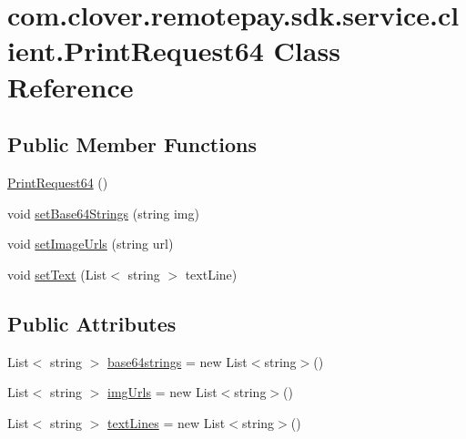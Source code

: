 \hypertarget{classcom_1_1clover_1_1remotepay_1_1sdk_1_1service_1_1client_1_1_print_request64}{}\section{com.\+clover.\+remotepay.\+sdk.\+service.\+client.\+Print\+Request64 Class Reference}
\label{classcom_1_1clover_1_1remotepay_1_1sdk_1_1service_1_1client_1_1_print_request64}
\subsection*{Public Member Functions}
\begin{DoxyCompactItemize}
\item 
\hyperlink{classcom_1_1clover_1_1remotepay_1_1sdk_1_1service_1_1client_1_1_print_request64_a1ee835745ac63886a435e6251f254d6b}{Print\+Request64} ()
\item 
void \hyperlink{classcom_1_1clover_1_1remotepay_1_1sdk_1_1service_1_1client_1_1_print_request64_ac56e340b57479f34256fe40683f8f828}{set\+Base64\+Strings} (string img)
\item 
void \hyperlink{classcom_1_1clover_1_1remotepay_1_1sdk_1_1service_1_1client_1_1_print_request64_a1b8f494d15d8254e34c64de39f700d8c}{set\+Image\+Urls} (string url)
\item 
void \hyperlink{classcom_1_1clover_1_1remotepay_1_1sdk_1_1service_1_1client_1_1_print_request64_a68e4b8eec88c34394418ca42d6136382}{set\+Text} (List$<$ string $>$ text\+Line)
\end{DoxyCompactItemize}
\subsection*{Public Attributes}
\begin{DoxyCompactItemize}
\item 
List$<$ string $>$ \hyperlink{classcom_1_1clover_1_1remotepay_1_1sdk_1_1service_1_1client_1_1_print_request64_ad89d3c99300f7b2458df750577464529}{base64strings} = new List$<$string$>$()
\item 
List$<$ string $>$ \hyperlink{classcom_1_1clover_1_1remotepay_1_1sdk_1_1service_1_1client_1_1_print_request64_ab0ff762435d6b90499fa9e71ce036e65}{img\+Urls} = new List$<$string$>$()
\item 
List$<$ string $>$ \hyperlink{classcom_1_1clover_1_1remotepay_1_1sdk_1_1service_1_1client_1_1_print_request64_aadc6a01e2621adc93e12226fadf29f4f}{text\+Lines} = new List$<$string$>$()
\end{DoxyCompactItemize}
